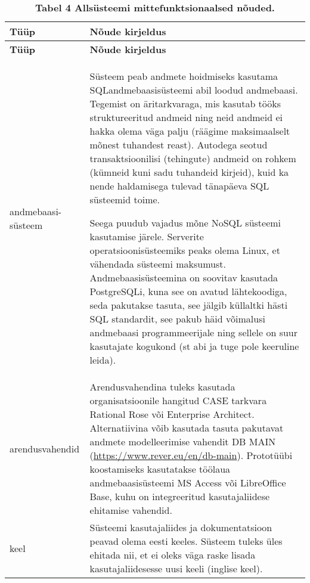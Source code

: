 \begin{longtabu} to \textwidth {|X[0.2] | X |}
	\caption{\textbf{Tabel 4 Allsüsteemi mittefunktsionaalsed nõuded.}} \\
	\hline
	\textbf{Tüüp}   &   \textbf{Nõude kirjeldus}  \\
	\hline
	\endfirsthead
	\hline
	\textbf{Tüüp}   &   \textbf{Nõude kirjeldus}  \\
	\hline
	\endhead
	andmebaasi- süsteem 
	& Süsteem peab andmete hoidmiseks kasutama SQLandmebaasisüsteemi abil loodud andmebaasi. Tegemist on äritarkvaraga, mis kasutab tööks struktureeritud andmeid ning neid andmeid ei hakka olema väga palju (räägime maksimaalselt mõnest tuhandest reast). Autodega seotud transaktsioonilisi (tehingute) andmeid on rohkem (kümneid kuni sadu tuhandeid kirjeid), kuid ka nende haldamisega tulevad tänapäeva SQL süsteemid toime.
	\linebreak \par  Seega puudub vajadus mõne NoSQL süsteemi kasutamise järele. Serverite operatsioonisüsteemiks peaks olema Linux, et vähendada süsteemi maksumust. Andmebaasisüsteemina on soovitav kasutada PostgreSQLi, kuna see on avatud lähtekoodiga, seda pakutakse tasuta, see jälgib küllaltki hästi SQL standardit, see pakub häid võimalusi andmebaasi programmeerijale ning sellele on suur kasutajate kogukond (st abi ja tuge pole keeruline leida). \\ \hline
	
	arendusvahendid 
	& Arendusvahendina tuleks kasutada organisatsioonile hangitud CASE tarkvara Rational Rose või Enterprise Architect. Alternatiivina võib kasutada tasuta pakutavat andmete modelleerimise vahendit DB MAIN 
	(\url{https://www.rever.eu/en/db-main}). Prototüübi koostamiseks kasutatakse töölaua andmebaasisüsteemi MS Access või LibreOffice Base, kuhu on integreeritud kasutajaliidese ehitamise vahendid.  \\ \hline
	
	keel 
	& Süsteemi kasutajaliides ja dokumentatsioon peavad olema eesti keeles. Süsteem tuleks üles ehitada nii, et ei oleks väga raske lisada kasutajaliidesesse uusi keeli (inglise keel).  \\ \hline
	

\end{longtabu}
